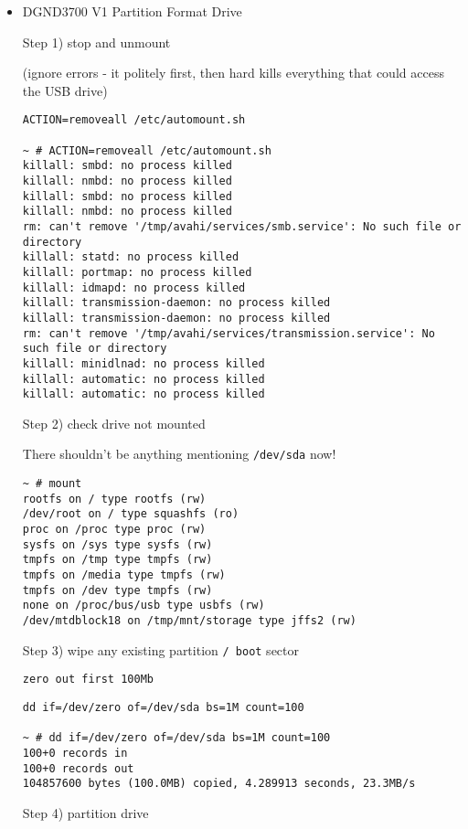 \begin{itemize}

\item DGND3700 V1 Partition Format Drive

Step 1) stop and unmount

(ignore errors - it politely first, then hard kills everything that could access the USB drive)

\begin{verbatim}
ACTION=removeall /etc/automount.sh

~ # ACTION=removeall /etc/automount.sh
killall: smbd: no process killed
killall: nmbd: no process killed
killall: smbd: no process killed
killall: nmbd: no process killed
rm: can't remove '/tmp/avahi/services/smb.service': No such file or directory
killall: statd: no process killed
killall: portmap: no process killed
killall: idmapd: no process killed
killall: transmission-daemon: no process killed
killall: transmission-daemon: no process killed
rm: can't remove '/tmp/avahi/services/transmission.service': No such file or directory
killall: minidlnad: no process killed
killall: automatic: no process killed
killall: automatic: no process killed
\end{verbatim}

Step 2) check drive not mounted

There shouldn't be anything mentioning \verb=/dev/sda= now!

\begin{verbatim}
~ # mount 
rootfs on / type rootfs (rw)
/dev/root on / type squashfs (ro)
proc on /proc type proc (rw)
sysfs on /sys type sysfs (rw)
tmpfs on /tmp type tmpfs (rw)
tmpfs on /media type tmpfs (rw)
tmpfs on /dev type tmpfs (rw)
none on /proc/bus/usb type usbfs (rw)
/dev/mtdblock18 on /tmp/mnt/storage type jffs2 (rw)
\end{verbatim}

Step 3) wipe any existing partition \verb=/ boot= sector

\begin{verbatim}
zero out first 100Mb
\end{verbatim}

\begin{verbatim}
dd if=/dev/zero of=/dev/sda bs=1M count=100

~ # dd if=/dev/zero of=/dev/sda bs=1M count=100
100+0 records in
100+0 records out
104857600 bytes (100.0MB) copied, 4.289913 seconds, 23.3MB/s
\end{verbatim}

Step 4) partition drive


\end{itemize}
